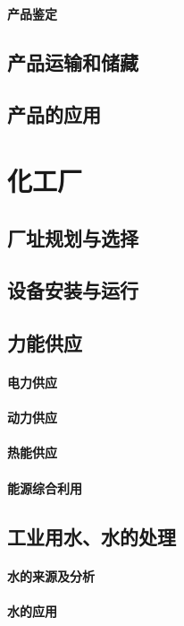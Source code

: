 \documentclass[UTF8]{../../ApplicationUniverse}
\begin{document}
    \subsubsection{产品鉴定}
\section{产品运输和储藏}
\section{产品的应用}




\chapter{化工厂}
\section{厂址规划与选择}
\section{设备安装与运行}
\section{力能供应}
    \subsubsection{电力供应}
    \subsubsection{动力供应}
    \subsubsection{热能供应}
    \subsubsection{能源综合利用}
\section{工业用水、水的处理}
    \subsubsection{水的来源及分析}
    \subsubsection{水的应用}
\end{document}
